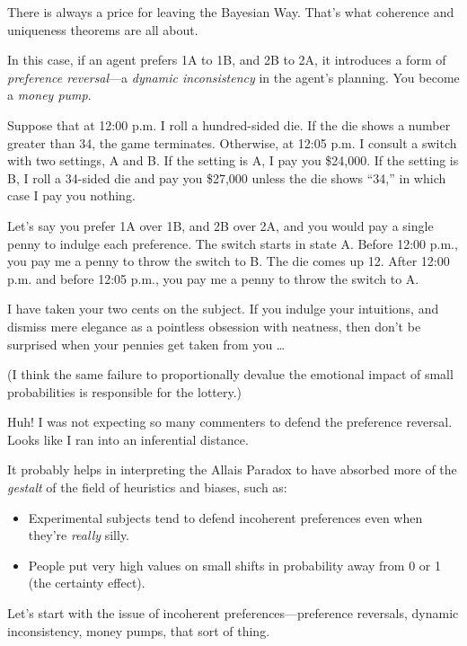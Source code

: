 {
 There is always a price for leaving the Bayesian Way.
That's what coherence and uniqueness theorems are all
about.}

{
 In this case, if an agent prefers 1A to 1B, and 2B to 2A, it
introduces a form of \textit{preference reversal}{}---a \textit{dynamic
inconsistency} in the agent's planning. You become a
\textit{money pump}.}

{
 Suppose that at 12:00 p.m. I roll a hundred-sided die. If the die
shows a number greater than 34, the game terminates. Otherwise, at
12:05 p.m. I consult a switch with two settings, A and B. If the
setting is A, I pay you \$24,000. If the setting is B, I roll a
34-sided die and pay you \$27,000 unless the die shows
``34,'' in which case I pay you
nothing.}

{
 Let's say you prefer 1A over 1B, and 2B over 2A,
and you would pay a single penny to indulge each preference. The switch
starts in state A. Before 12:00 p.m., you pay me a penny to throw the
switch to B. The die comes up 12. After 12:00 p.m. and before 12:05
p.m., you pay me a penny to throw the switch to A.}

{
 I have taken your two cents on the subject. If you indulge your
intuitions, and dismiss mere elegance as a pointless obsession with
neatness, then don't be surprised when your pennies get
taken from you \ldots}

{
 (I think the same failure to proportionally devalue the emotional
impact of small probabilities is responsible for the lottery.)}

\myendsectiontext



{
 Huh! I was not expecting so many commenters to defend the
preference reversal. Looks like I ran into an inferential distance. }

{
 It probably helps in interpreting the Allais Paradox to have
absorbed more of the \textit{gestalt} of the field of heuristics and
biases, such as:}

\begin{itemize}
\item {
 Experimental subjects tend to defend incoherent preferences even
when they're \textit{really} silly.}

\item {
 People put very high values on small shifts in probability away
 from 0 or 1 (the certainty effect).}
\end{itemize}

{
 Let's start with the issue of incoherent
preferences---preference reversals, dynamic inconsistency, money pumps,
that sort of thing.}


